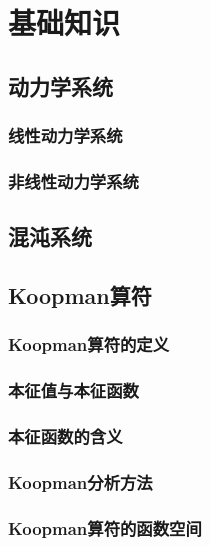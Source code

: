 \chapter{基础知识}

\section{动力学系统}

\subsection{线性动力学系统}

\subsection{非线性动力学系统}

\section{混沌系统}

\section{Koopman算符}

\subsection{Koopman算符的定义}

\subsection{本征值与本征函数}

\subsection{本征函数的含义}

\subsection{Koopman分析方法}

\subsection{Koopman算符的函数空间}

% 
% 
